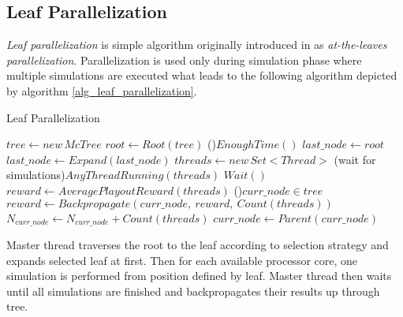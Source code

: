 \subsection{Leaf Parallelization}

\emph{Leaf parallelization} is simple algorithm originally introduced in \cite{Cazenave2007} as
\emph{at-the-leaves parallelization}. Parallelization is used only during simulation phase where
multiple simulations are executed what leads to the following algorithm depicted by algorithm
\ref{alg_leaf_parallelization}.

\begin{algorithm}
\DontPrintSemicolon
\caption{Leaf Parallelization}
\label{alg_leaf_parallelization}
\label{alg_mcts_loop_general}
$tree \leftarrow new\,McTree$ \;
$root \leftarrow Root(tree)$\;
\While(){$EnoughTime()$}{
    $last\_node \leftarrow root$ \;
    $last\_node \leftarrow Expand(last\_node)$ \;
    $threads \leftarrow new\,Set<Thread>$ \;
    \While(wait for simulations){$AnyThreadRunning(threads)$}{
        $Wait()$\;
    }
    $reward \leftarrow AveragePlayoutReward(threads)$\;
    \While(){$curr\_node \in tree$}{
        $reward \leftarrow Backpropagate(curr\_node,\:reward,\:Count(threads))$\;
        $N_{curr\_node} \leftarrow N_{curr\_node}+Count(threads)$ \;
        $curr\_node \leftarrow Parent(curr\_node)$\;
    }
}
 \;
\end{algorithm}

Master thread traverses the root to the leaf according to selection strategy and expands selected
leaf at first. Then for each available processor core, one simulation is performed from position
defined by leaf. Master thread then waits until all simulations are finished and backpropagates
their results up through tree.

